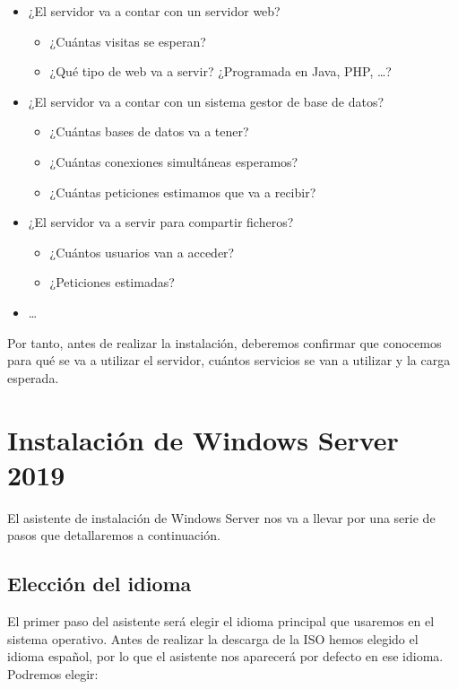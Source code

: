 \begin{itemize}
    \item ¿El servidor va a contar con un servidor web?
    \begin{itemize}
        \item ¿Cuántas visitas se esperan?
        \item ¿Qué tipo de web va a servir? ¿Programada en Java, PHP, …?
    \end{itemize}
    \item ¿El servidor va a contar con un sistema gestor de base de datos?
    \begin{itemize}
        \item ¿Cuántas bases de datos va a tener?
        \item ¿Cuántas conexiones simultáneas esperamos?
        \item ¿Cuántas peticiones estimamos que va a recibir?
    \end{itemize}
    \item ¿El servidor va a servir para compartir ficheros?
    \begin{itemize}
        \item ¿Cuántos usuarios van a acceder?
        \item ¿Peticiones estimadas?
    \end{itemize}
    \item …
\end{itemize}

Por tanto, antes de realizar la instalación, deberemos confirmar que conocemos para qué se va a utilizar el servidor, cuántos servicios se van a utilizar y la carga esperada.

\section{Instalación de Windows Server 2019}
El asistente de instalación de Windows Server nos va a llevar por una serie de pasos que detallaremos a continuación.

\subsection{Elección del idioma}

El primer paso del asistente será elegir el idioma principal que usaremos en el sistema operativo.
Antes de realizar la descarga de la ISO hemos elegido el idioma español, por lo que el asistente nos aparecerá por defecto en ese idioma. Podremos elegir:


